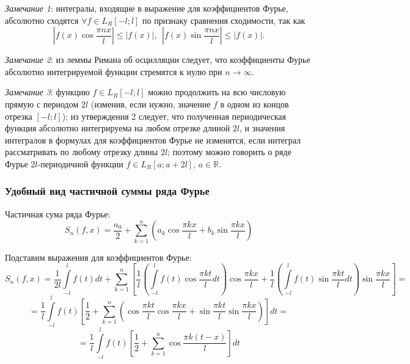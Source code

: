 \documentclass[12pt, a4paper, reqno]{article}
\begin{document}
    \textit{Замечание 1}: интегралы, входящие в выражение для коэффициентов Фурье, абсолютно сходятся
    $\forall f \in L_R[-l; l]$ по признаку сравнения сходимости, так как
    \begin{equation*}
        \left|f(x)\cos{\frac{\pi nx}{l}}\right| \leq |f(x)|,\ \
        \left|f(x)\sin{\frac{\pi nx}{l}}\right| \leq |f(x)|.
    \end{equation*}

    \textit{Замечание 2}: из леммы Римана об осцилляции следует, что коэффициенты Фурье абсолютно
    интегрируемой функции стремятся к нулю при $n \to \infty$.

    \textit{Замечание 3}: функцию $f \in L_R[-l; l]$ можно продолжить на всю числовую прямую с
    периодом $2l$ (изменив, если нужно, значение $f$ в одном из концов отрезка $[-l; l]$); из
    утверждения 2 следует, что полученная периодическая функция абсолютно интегрируема на любом
    отрезке длиной $2l$, и значения интегралов в формулах для коэффициентов Фурье не изменятся,
    если интеграл рассматривать по любому отрезку длины $2l$; поэтому можно говорить о ряде
    Фурье $2l$-периодичной функции $f \in L_R[a; a + 2l]$, $a \in \mathbb{R}$.

    \subsubsection{Удобный вид частичной суммы ряда Фурье}

    Частичная сума ряда Фурье:
    \begin{equation*}
        S_n(f, x) = \frac{a_0}{2} + \sum\limits_{k = 1}^{n} \left(a_k \cos{\frac{\pi kx}{l}} +
                                                                  b_k \sin{\frac{\pi kx}{l}}\right)
    \end{equation*}

    Подставим выражения для коэффициентов Фурье:
    \begin{equation*}
        S_n(f, x) = \frac{1}{2l}\int\limits_{-l}^{l} f(t)dt +
        \sum\limits_{k = 1}^{n}
        \left[
            \frac{1}{l}\left(\int\limits_{-l}^{l}f(t)\cos{\frac{\pi kt}{l}}dt\right)\cos{\frac{\pi kx}{l}} +
            \frac{1}{l}\left(\int\limits_{-l}^{l}f(t)\sin{\frac{\pi kt}{l}}dt\right)\sin{\frac{\pi kx}{l}}
        \right] =
    \end{equation*}
    \begin{equation*}
        = \frac{1}{l}\int\limits_{-l}^{l} f(t)
        \left[
            \frac{1}{2} + \sum\limits_{k = 1}^{n}
            \left(
                \cos{\frac{\pi kt}{l}}\cos{\frac{\pi kx}{l}} +
                \sin{\frac{\pi kt}{l}}\sin{\frac{\pi kx}{l}}
            \right)
        \right]dt =
    \end{equation*}
    \begin{equation*}
        = \frac{1}{l}\int\limits_{-l}^{l} f(t)
        \left[
            \frac{1}{2} + \sum\limits_{k = 1}^{n}\cos{\frac{\pi k(t - x)}{l}}
        \right]dt
    \end{equation*}
\end{document}
